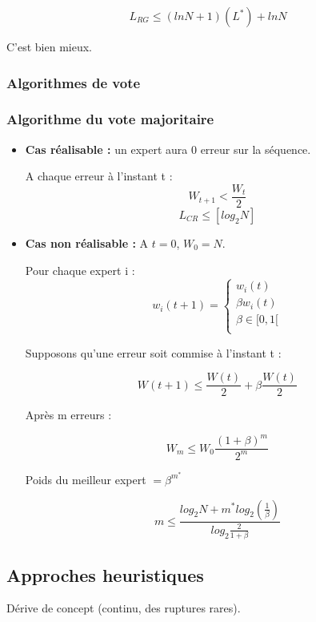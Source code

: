 \documentclass{article}
\begin{document}
\[ L_{RG} \leq (ln N + 1)(L^{*}) + ln N \]

C'est bien mieux.

\subsubsection{Algorithmes de vote}

\subsubsection*{Algorithme du vote majoritaire}

\begin{itemize}
\item \textbf{Cas réalisable :} un expert aura 0 erreur sur la séquence.

A chaque erreur à l'instant t : 
\[ W_{t+1} < \frac{W_t}{2} \]
\[ L_{CR} \leq [log_2 N] \]

\item \textbf{Cas non réalisable :} A $t = 0$, $W_0 = N$.

Pour chaque expert i :
\[ w_{i}(t+1) = \begin{cases}
               w_{i}(t) \\
               \beta w_{i}(t) \\
               \beta \in [0, 1[ \\
              \end{cases}
\]

Supposons qu'une erreur soit commise à l'instant t :

\[ W(t+1) \leq \frac{W(t)}{2} + \beta \frac{W(t)}{2} \]

Après m erreurs : 

\[ W_m \leq W_0 \frac{(1 + \beta)^m}{2^m} \]

\begin{center}
Poids du meilleur expert $ = \beta^{m^{*}} $
\end{center}

\[ m \leq \frac{log_2 N + m^{*} log_2 (\frac{1}{\beta})}{log_2 \frac{2}{1 + \beta}} \]

\end{itemize}

\subsection{Approches heuristiques}

Dérive de concept (continu, des ruptures rares).
\end{document}
